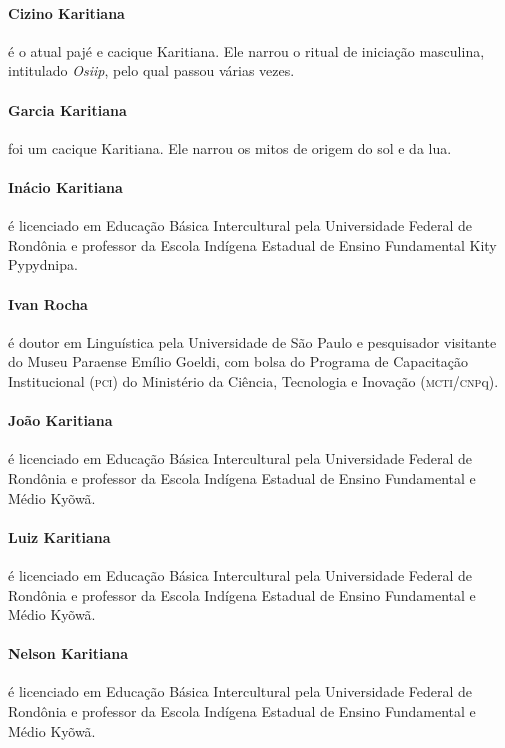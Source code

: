  \paragraph{Cizino Karitiana} é o atual pajé e cacique Karitiana. Ele narrou o ritual
 de iniciação masculina, intitulado \textit{Osiip}, pelo qual passou várias
 vezes.

 \paragraph{Garcia Karitiana} foi um cacique Karitiana. Ele narrou os mitos de origem
 do sol e da lua.

 \paragraph{Inácio Karitiana} é licenciado em Educação Básica Intercultural pela
 Universidade Federal de Rondônia e professor da Escola Indígena Estadual
 de Ensino Fundamental Kity Pypydnipa.

 \paragraph{Ivan Rocha} é doutor em Linguística pela Universidade de São Paulo e
 pesquisador visitante do Museu Paraense Emílio Goeldi, com bolsa do
 Programa de Capacitação Institucional (\textsc{pci}) do Ministério da Ciência,
 Tecnologia e Inovação (\textsc{mcti}/\textsc{cnp}q).

 \paragraph{João Karitiana} é licenciado em Educação Básica Intercultural pela
 Universidade Federal de Rondônia e professor da Escola Indígena Estadual
 de Ensino Fundamental e Médio Kyõwã.

 \paragraph{Luiz Karitiana} é licenciado em Educação Básica Intercultural pela
 Universidade Federal de Rondônia e professor da Escola Indígena Estadual
 de Ensino Fundamental e Médio Kyõwã.

 \paragraph{Nelson Karitiana} é licenciado em Educação Básica Intercultural pela
 Universidade Federal de Rondônia e professor da Escola Indígena Estadual
 de Ensino Fundamental e Médio Kyõwã.

